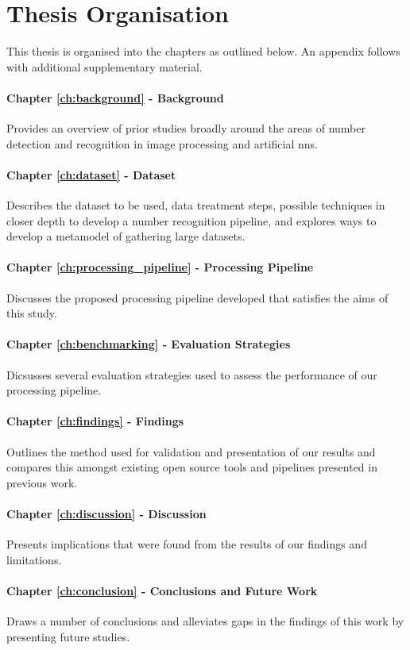 \section{Thesis Organisation}
\label{sec:introduction:organisation}

This thesis is organised into the chapters as outlined below. An appendix follows with additional supplementary material.


\paragraph{Chapter \ref{ch:background} - Background} Provides an overview of prior studies broadly around the areas of number detection and recognition in image processing and artificial \glspl{nn}.

\paragraph{Chapter \ref{ch:dataset} - Dataset} Describes the dataset to be used, data treatment steps, possible techniques in closer depth to develop a number recognition pipeline, and explores ways to develop a metamodel of gathering large datasets.

\paragraph{Chapter \ref{ch:processing_pipeline} - Processing Pipeline} Discusses the proposed processing pipeline developed that satisfies the aims of this study.

\paragraph{Chapter \ref{ch:benchmarking} - Evaluation Strategies} Dicsusses several evaluation strategies used to assess the performance of our processing pipeline.

\paragraph{Chapter \ref{ch:findings} - Findings} Outlines the method used for validation and presentation of our results and compares this amongst existing open source tools and pipelines presented in previous work.

\paragraph{Chapter \ref{ch:discussion} - Discussion} Presents implications that were found from the results of our findings and limitations.

\paragraph{Chapter \ref{ch:conclusion} - Conclusions and Future Work} Draws a number of conclusions and alleviates gaps in the findings of this work by presenting future studies.